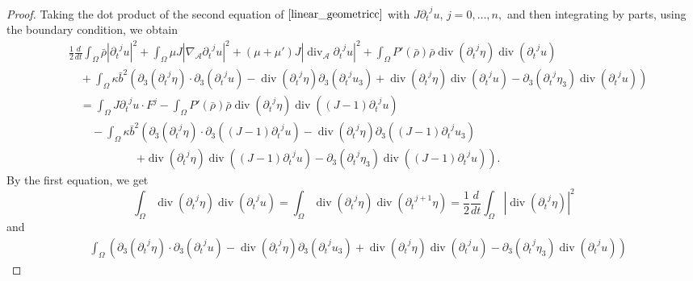 \documentclass[a4paper,reqno,11pt]{amsart}
\numberwithin{equation}{section}
\providecommand{\abs}[1]{\left\vert#1\right\vert}
\begin{document}
\begin{proof}
Taking the dot product of the second equation of $\eqref{linear_geometricc}$ with $J{\partial_t}^j u$, $j=0,\dots,n,$ and then integrating by parts, using the boundary condition, we obtain
\begin{equation}\label{i_ge_ev_0c}
\begin{split}
&{\frac{1}{2}}  \frac{d}{dt} \int_\Omega \bar \rho \abs{{\partial_t}^j u}^2
+ \int_\Omega  \mu J\abs{ {{\nabla}_{\mathcal{A}}}{\partial_t}^j u}^2 +(\mu+\mu') J\abs{ {\operatorname{div}_{\mathcal{A}}}{\partial_t}^j u}^2+\int_\Omega P '(\bar{\rho} )\bar\rho  \operatorname{div} ({\partial_t}^j \eta) \operatorname{div}({\partial_t}^j u)
\\&\quad+\int_\Omega\kappa\bar b^2\left(
  {\partial}_3 ({\partial_t}^j \eta)\cdot {\partial}_3({\partial_t}^j u)-\operatorname{div} ({\partial_t}^j \eta) {\partial}_3({\partial_t}^j u_3)+ \operatorname{div} ({\partial_t}^j \eta)\operatorname{div}({\partial_t}^j u)- {\partial}_3({\partial_t}^j \eta_3)\operatorname{div} ({\partial_t}^j u)\right)
\\&\quad =\int_\Omega J{\partial_t}^j u\cdot F^{j}-\int_\Omega P '(\bar{\rho} )\bar\rho  \operatorname{div} ({\partial_t}^j \eta) \operatorname{div}((J-1){\partial_t}^j u)
\\&\qquad- \int_\Omega
\kappa\bar b^2\left( {\partial}_3 ({\partial_t}^j \eta)\cdot {\partial}_3((J-1){\partial_t}^j u)-\operatorname{div} ({\partial_t}^j \eta) {\partial}_3((J-1){\partial_t}^j u_3) \right.
\\&\qquad\qquad\qquad \left.  +\operatorname{div} ({\partial_t}^j \eta)\operatorname{div}((J-1){\partial_t}^j u)- {\partial}_3({\partial_t}^j \eta_3)\operatorname{div} ((J-1){\partial_t}^j u)\right).
\end{split}
\end{equation}
By the first equation, we get
\begin{equation}\label{i_te_2c}
\int_\Omega   \operatorname{div} ({\partial_t}^j \eta) \operatorname{div}({\partial_t}^j u) = \int_\Omega   \operatorname{div} ({\partial_t}^j \eta) \operatorname{div}({\partial_t}^{j+1} \eta)
={\frac{1}{2}}{ \frac{d}{dt}} \int_\Omega   \abs{ \operatorname{div} ({\partial_t}^j \eta) }^2
\end{equation}
and
\begin{equation}\label{i_te_2c1}
\begin{split}
&\int_\Omega
 \left( {\partial}_3 ({\partial_t}^j \eta)\cdot {\partial}_3({\partial_t}^j u)-\operatorname{div} ({\partial_t}^j \eta) {\partial}_3({\partial_t}^j u_3)+ \operatorname{div} ({\partial_t}^j \eta)\operatorname{div}({\partial_t}^j u)- {\partial}_3({\partial_t}^j \eta_3)\operatorname{div} ({\partial_t}^j u)\right)

\end{split}
\end{equation}
\end{proof}
\end{document}
